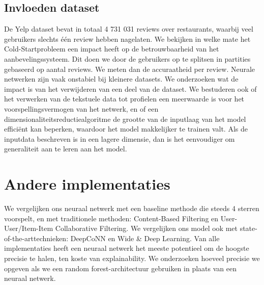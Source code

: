 \subsection{Invloeden dataset}
De Yelp dataset bevat in totaal 4 731 031 reviews over restaurants, waarbij veel gebruikers slechts één review hebben nagelaten. We bekijken in welke mate het Cold-Startprobleem een impact heeft op de betrouwbaarheid van het aanbevelingssysteem. Dit doen we door de gebruikers op te splitsen in partities gebaseerd op aantal reviews. We meten dan de accuraatheid per review.\newline
Neurale netwerken zijn vaak onstabiel bij kleinere datasets. We onderzoeken wat de impact is van het verwijderen van een deel van de dataset.\newline
We bestuderen ook of het verwerken van de tekstuele data tot profielen een meerwaarde is voor het voorspellingsvermogen van het netwerk, en of een dimensionaliteitsreductiealgoritme de grootte van de inputlaag van het model efficiënt kan beperken, waardoor het model makkelijker te trainen valt. Als de inputdata beschreven is in een lagere dimensie, dan is het eenvoudiger om generaliteit aan te leren aan het model. \cite{curse_of_dim}

\section{Andere implementaties}
We vergelijken ons neuraal netwerk met een baseline methode die steeds 4 sterren voorspelt, en met traditionele methoden: Content-Based Filtering en User-User/Item-Item Collaborative Filtering. We vergelijken ons model ook met state-of-the-arttechnieken: DeepCoNN en Wide \& Deep Learning.\newline
Van alle implementaties heeft een neuraal netwerk het meeste potentieel om de hoogste precisie te halen, ten koste van explainability. We onderzoeken hoeveel precisie we opgeven als we een random forest-architectuur gebruiken in plaats van een neuraal netwerk.
